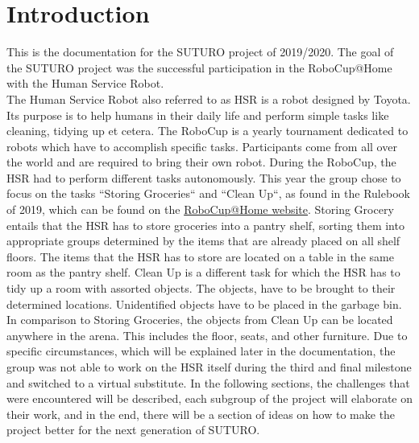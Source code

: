 \documentclass[main.tex]{subfiles}
\begin{document}
	\chapter{Introduction}
	\label{introduction}
	
	This is the documentation for the SUTURO project of 2019/2020. The goal of the SUTURO project was the successful participation in the RoboCup@Home with the Human Service Robot. \\
	The Human Service Robot also referred to as HSR is a robot designed by Toyota. Its purpose is to help humans in their daily life and perform simple tasks like cleaning, tidying up et cetera. The RoboCup is a yearly tournament dedicated to robots which have to accomplish specific tasks. Participants come from all over the world and are required to bring their own robot.
During the RoboCup, the HSR had to perform different tasks autonomously.
This year the group chose to focus on the tasks “Storing Groceries“ and “Clean Up“, as found in the Rulebook of 2019, which can be found on the \href{http://www.robocupathome.org/rules}{RoboCup@Home website}. 
	Storing Grocery entails that the HSR has to store groceries into a pantry shelf, sorting them into appropriate groups determined by the items that are already placed on all shelf floors. The items that the HSR has to store are located on a table in the same room as the pantry shelf.
Clean Up is a different task for which the HSR has to tidy up a room with assorted objects. The objects, have to be brought to their determined locations. Unidentified objects have to be placed in the garbage bin. In comparison to Storing Groceries, the objects from Clean Up can be located anywhere in the arena. This includes the floor, seats, and other furniture.
Due to specific circumstances, which will be explained later in the documentation, the group was not able to work on the HSR itself during the third and final milestone and switched to a virtual substitute.
	In the following sections, the challenges that were encountered will be described, each subgroup of the project will elaborate on their work, and in the end, there will be a section of ideas on how to make the project better for the next generation of SUTURO.
	
\end{document}

